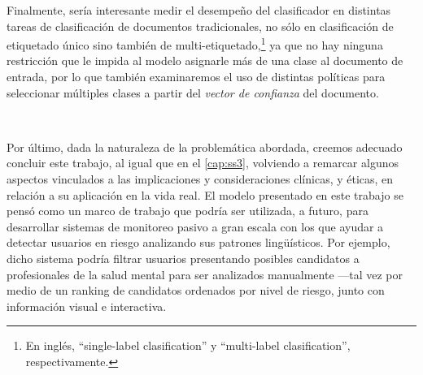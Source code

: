 Finalmente, sería interesante medir el desempeño del clasificador en distintas tareas de clasificación de documentos tradicionales, no sólo en clasificación de etiquetado único sino también de multi-etiquetado,\footnote{En inglés, ``single-label clasification'' y ``multi-label clasification'', respectivamente.} ya que no hay ninguna restricción que le impida al modelo asignarle más de una clase al documento de entrada, por lo que también examinaremos el uso de distintas políticas para seleccionar múltiples clases a partir del \emph{vector de confianza} del documento.

\

Por último, dada la naturaleza de la problemática abordada, creemos adecuado concluir este trabajo, al igual que en el \autoref{cap:ss3}, volviendo a remarcar algunos aspectos vinculados a las implicaciones y consideraciones clínicas, y éticas, en relación a su aplicación en la vida real.
El modelo presentado en este trabajo se pensó como un marco de trabajo que podría ser utilizada, a futuro, para desarrollar sistemas de monitoreo pasivo a gran escala con los que ayudar a detectar usuarios en riesgo analizando sus patrones lingüísticos. Por ejemplo, dicho sistema podría filtrar usuarios presentando posibles candidatos a profesionales de la salud mental para ser analizados manualmente ---tal vez por medio de un ranking de candidatos ordenados por nivel de riesgo, junto con información visual e interactiva.
